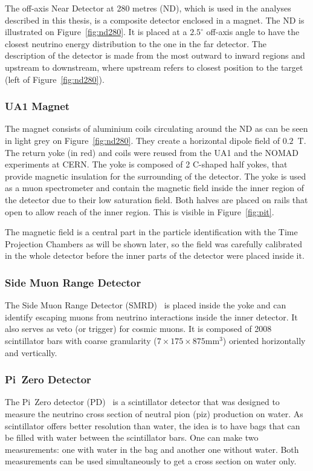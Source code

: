 The off-axis Near Detector at 280 metres (\Gls{ND}), which is used in
the analyses described in this thesis, is a composite detector
enclosed in a magnet. The \Gls{ND} is illustrated on
Figure~\ref{fig:nd280}. It is placed at a $2.5^{\circ}$ off-axis angle
to have the closest neutrino energy distribution to the one in the far
detector. The description of the detector is made from the most
outward to inward regions and upstream to downstream, where upstream
refers to closest position to the target (left of
Figure~\ref{fig:nd280}).

\subsubsection{UA1 Magnet}
\label{subsubsec:magnet}
The magnet consists of aluminium coils circulating around the \Gls{ND}
as can be seen in light grey on Figure~\ref{fig:nd280}. They create a
horizontal dipole field of $0.2$~T. The return yoke (in red) and coils
were reused from the UA1 and the \Gls{NOMAD} experiments at CERN. The
yoke is composed of 2 C-shaped half yokes, that provide magnetic
insulation for the surrounding of the detector. The yoke is used as a
muon spectrometer and contain the magnetic field inside the inner
region of the detector due to their low saturation field. Both halves
are placed on rails that open to allow reach of the inner region. This
is visible in Figure~\ref{fig:pit}.

The magnetic field is a central part in the particle identification
with the Time Projection Chambers as will be shown later, so the field
was carefully calibrated in the whole detector before the inner parts
of the detector were placed inside it.

\subsubsection{Side Muon Range Detector}
\label{subsubsec:smrd}
The Side Muon Range Detector (\Gls{SMRD})~\cite{SMRD} is placed inside
the yoke and can identify escaping muons from neutrino interactions
inside the inner detector. It also serves as veto (or trigger) for
cosmic muons.  It is composed of 2008 scintillator bars with coarse
granularity ($7 \times 175 \times 875 \text{mm}^{3}$) oriented
horizontally and vertically.

\subsubsection{Pi~Zero Detector}
\label{subsubsec:p0d}
The Pi~Zero detector (\Gls{PD})~\cite{POD} is a scintillator detector
that was designed to measure the neutrino cross section of neutral
pion (\gls{piz}) production on water. As scintillator offers better
resolution than water, the idea is to have bags that can be filled
with water between the scintillator bars. One can make two
measurements: one with water in the bag and another one without
water. Both measurements can be used simultaneously to get a cross
section on water only.

